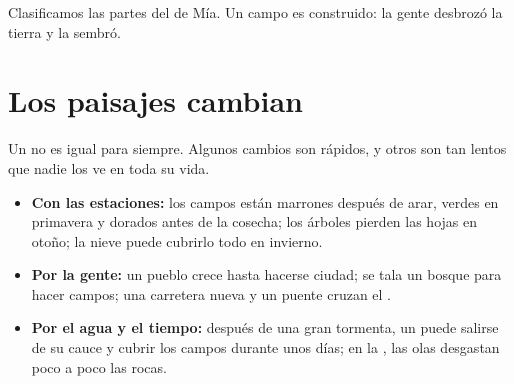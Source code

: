 \begin{omfigure}

{\small Clasificamos las partes del  de Mía. Un campo es construido:
la gente desbrozó la tierra y la sembró.}
\label{fig:g1:landscapes-around-us:sort}
\end{omfigure}

\section{Los paisajes cambian}

Un  no es igual para siempre. Algunos cambios son rápidos, y otros
son tan lentos que nadie los ve en toda su vida.
\begin{itemize}
  \item \textbf{Con las estaciones:} los campos están marrones después de
        arar, verdes en primavera y dorados antes de la cosecha; los
        árboles pierden las hojas en otoño; la nieve puede cubrirlo todo en
        invierno.
  \item \textbf{Por la gente:} un pueblo crece hasta hacerse ciudad; se
        tala un bosque para hacer campos; una carretera nueva y un puente
        cruzan el .
  \item \textbf{Por el agua y el tiempo:} después de una gran tormenta, un
         puede salirse de su cauce y cubrir los campos durante unos días;
        en la , las olas desgastan poco a poco las rocas.
\end{itemize}

